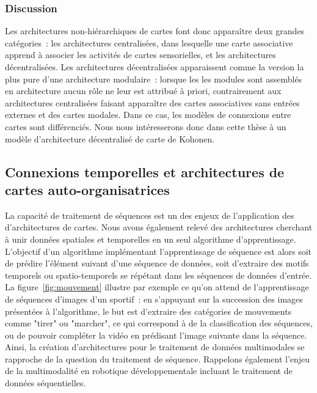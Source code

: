 \documentclass[../main]{subfiles}
\begin{document}
{\subsubsection{Discussion}

Les architectures non-hiérarchiques de cartes font donc apparaître deux grandes catégories~: les architectures centralisées, dans lesquelle une carte associative apprend à associer les activités de cartes sensorielles, et les architectures décentralisées.
Les architectures décentralisées apparaissent comme la version la plus pure d'une architecture modulaire~: lorsque les les modules sont assemblés en architecture aucun rôle ne leur est attribué à priori, contrairement aux architectures centralisées faisant apparaître des cartes associatives sans entrées externes et des cartes modales. Dans ce cas, les modèles de connexions entre cartes sont différenciés.
Nous nous intéresserons donc dans cette thèse à un modèle d'architecture décentralisé de carte de Kohonen.

\subsection{Connexions temporelles et architectures de cartes auto-organisatrices}

La capacité de traitement de séquences est un des enjeux de l'application des d'architectures de cartes. Nous avons également relevé des architectures cherchant à unir données spatiales et temporelles en un seul algorithme d'apprentissage. L'objectif d'un algorithme implémentant l'apprentissage de séquence est alors soit de prédire l'élément suivant d'une séquence de données, soit d'extraire des motifs temporels ou spatio-temporels se répétant dans les séquences de données d'entrée. 
La figure~\ref{fig:mouvement} illustre par exemple ce qu'on attend de l'apprentissage de séquences d'images d'un sportif~: en s'appuyant sur la succession des images présentées à l'algorithme, le but est d'extraire des catégories de mouvements comme "tirer" ou "marcher", ce qui correspond à de la classification des séquences, ou de pouvoir compléter la vidéo en prédisant l'image suivante dans la séquence.
Ainsi, la création d'architectures pour le traitement de données multimodales se rapproche de la question du traitement de séquence. Rappelons également l'enjeu de la multimodalité en robotique développementale incluant le traitement de données séquentielles.


}
\end{document}
